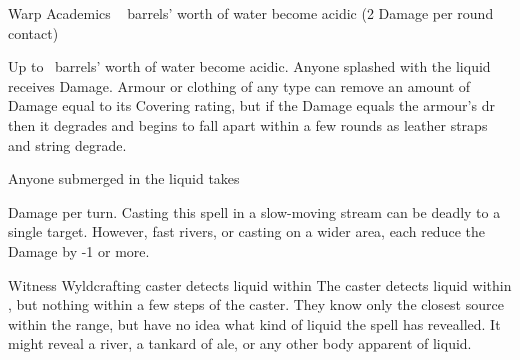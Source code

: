   {\mWater}%
  {Warp}%
  {\duplicated}%
  {Academics}%
  {\spellArea\  barrels' worth of water become acidic (2 Damage per round contact)}%
  {
    Up to \spellArea\ barrels' worth of water become acidic.
    Anyone splashed with the liquid receives  Damage. 
    Armour or clothing of any type can remove an amount of Damage equal to its Covering rating, but if the Damage equals the armour's \gls{dr} then it degrades and begins to fall apart within a few rounds as leather straps and string degrade.

    Anyone submerged in the liquid takes \addtocounter{spelllevel}{2}  Damage per turn.
    Casting this spell in a slow-moving stream can be deadly to a single target.
    However, fast rivers, or casting on a wider area, each reduce the Damage by -1 or more.
  }

  {\mWater}%
  {Witness}%
  {\distant}%
  {Wyldcrafting}%
  {caster detects liquid within \spellRange}%
  {
    The caster detects liquid within \spellRange, but nothing within a few steps of the caster.
    They know only the closest source within the range, but have no idea what kind of liquid the spell has revealled.
    It might reveal a river, a tankard of ale, or any other body apparent of liquid.
  }
